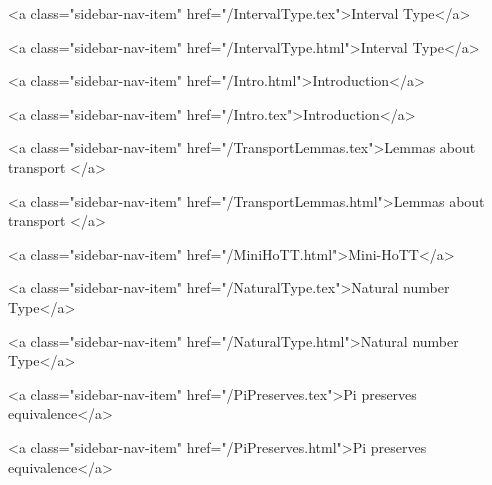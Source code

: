           <a class="sidebar-nav-item" href="/IntervalType.tex">Interval Type</a>
        
      
    
      
        
          <a class="sidebar-nav-item" href="/IntervalType.html">Interval Type</a>
        
      
    
      
        
          <a class="sidebar-nav-item" href="/Intro.html">Introduction</a>
        
      
    
      
        
          <a class="sidebar-nav-item" href="/Intro.tex">Introduction</a>
        
      
    
      
        
          <a class="sidebar-nav-item" href="/TransportLemmas.tex">Lemmas about transport </a>
        
      
    
      
        
          <a class="sidebar-nav-item" href="/TransportLemmas.html">Lemmas about transport </a>
        
      
    
      
        
          <a class="sidebar-nav-item" href="/MiniHoTT.html">Mini-HoTT</a>
        
      
    
      
        
          <a class="sidebar-nav-item" href="/NaturalType.tex">Natural number Type</a>
        
      
    
      
        
          <a class="sidebar-nav-item" href="/NaturalType.html">Natural number Type</a>
        
      
    
      
        
          <a class="sidebar-nav-item" href="/PiPreserves.tex">Pi preserves equivalence</a>
        
      
    
      
        
          <a class="sidebar-nav-item" href="/PiPreserves.html">Pi preserves equivalence</a>
        
      
    
